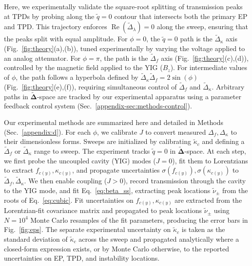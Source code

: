 \documentclass[%
  reprint,
  amsmath,amssymb,
  aps,
  prapplied,
  superscriptaddress,
  longbibliography]{revtex4-2}
\begin{document}
Here, we experimentally validate the square-root splitting of transmission peaks at TPDs by probing along the $\tilde{q} = 0$ contour that intersects both the primary EP and TPD. This trajectory enforces $\operatorname{Re}(\tilde{\Delta}_\lambda)=0$ along the sweep, ensuring that the peaks split with equal amplitude. For $\phi = 0$, the $\tilde{q} = 0$ path is the $\tilde{\Delta}_\kappa$ axis (Fig.~\ref{fig:theory}(a),(b)), tuned experimentally by varying the voltage applied to an analog attenuator. For $\phi = \pi$, the path is the $\tilde{\Delta}_f$ axis (Fig.~\ref{fig:theory}(c),(d)), controlled by the magnetic field applied to the YIG ($B_z$). For intermediate values of $\phi$, the path follows a hyperbola defined by $\tilde{\Delta}_\kappa \tilde{\Delta}_f = 2 \sin(\phi)$ (Fig.~\ref{fig:theory}(e),(f)), requiring simultaneous control of $\tilde{\Delta}_f$ and $\tilde{\Delta}_\kappa$. Arbitrary paths in $\boldsymbol{\tilde{\Delta}}$-space are tracked by our experimental apparatus using a parameter feedback control system (Sec.~\ref{appendix-sec:methods-control}).

Our experimental methods are summarized here and detailed in Methods (Sec.~\ref{appendix:d}). For each $\phi$, we calibrate $J$ to convert measured $\Delta_f, \Delta_\kappa$ to their dimensionless forms. Sweeps are initialized by calibrating $\tilde{\kappa}_c$ and defining a $\tilde{\Delta}_f$ or $\tilde{\Delta}_\kappa$ range to sweep. The experiment tracks $\tilde{q} = 0$ in $\boldsymbol{\tilde{\Delta}}$-space. At each step, we first probe the uncoupled cavity (YIG) modes ($J=0$), fit them to Lorentzians to extract $f_{c(y)}, \kappa_{c(y)}$, and propagate uncertainties $\sigma(f_{c(y)}), \sigma(\kappa_{c(y)})$ to $\tilde{\Delta}_f, \tilde{\Delta}_\kappa$. We then enable coupling ($J>0$), record transmission through the cavity to the YIG mode, and fit Eq.~\ref{eq:beta_ss}, extracting peak locations $\tilde{\nu}_\pm$ from the roots of Eq.~\ref{eq:cubic}. Fit uncertainties on $f_{c(y)}, \kappa_{c(y)}$ are extracted from the Lorentzian-fit covariance matrix and propagated to peak locations $\tilde{\nu}_\pm$ using $N = 10^4$ Monte Carlo resamples of the fit parameters, producing the error bars in Fig.~\ref{fig:eps}. The separate experimental uncertainty on $\tilde{\kappa}_c$ is taken as the standard deviation of $\tilde{\kappa}_c$ across the sweep and propagated analytically where a closed-form expression exists, or by Monte Carlo otherwise, to the reported uncertainties on EP, TPD, and instability locations.
\end{document}
